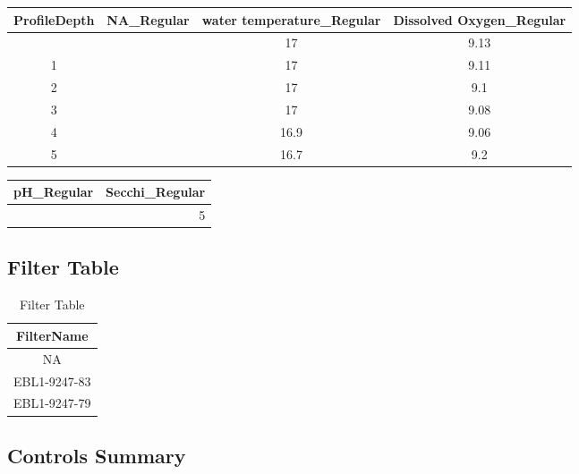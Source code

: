 \documentclass[
  letterpaper,
  DIV=11,
  numbers=noendperiod]{scrartcl}
\begin{document}
\begin{table}

\caption{\label{tbl-results}Results
Table}\begin{minipage}[t]{\linewidth}
\subcaption{\label{tbl-results-1}}

{\centering 

\begin{longtable*}{cccc}
\toprule
ProfileDepth & NA\_Regular & water temperature\_Regular & Dissolved Oxygen\_Regular \\ 
\midrule{} &  & 17 & 9.13 \\ 
1 &  & 17 & 9.11 \\ 
2 &  & 17 & 9.1 \\ 
3 &  & 17 & 9.08 \\ 
4 &  & 16.9 & 9.06 \\ 
5 &  & 16.7 & 9.2 \\ 
\bottomrule
\end{longtable*}

}

\end{minipage}%
\newline
\begin{minipage}[t]{\linewidth}
\subcaption{\label{tbl-results-2}}

{\centering 

\begin{longtable*}{rr}
\toprule
pH\_Regular & Secchi\_Regular \\ 
\midrule{} & 5 \\ 
\bottomrule
\end{longtable*}

}

\end{minipage}%

\end{table}

\hypertarget{filter-table}{%
\subsection{Filter Table}\label{filter-table}}

\hypertarget{tbl-filter}{}
\begin{longtable}{c}
\caption{\label{tbl-filter}Filter Table }\tabularnewline

\toprule
FilterName \\ 
\midrule\addlinespace[2.5pt]
NA \\ 
EBL1-9247-83 \\ 
EBL1-9247-79 \\ 
\bottomrule
\end{longtable}

\hypertarget{controls-summary}{%
\subsection{Controls Summary}\label{controls-summary}}
\end{document}
